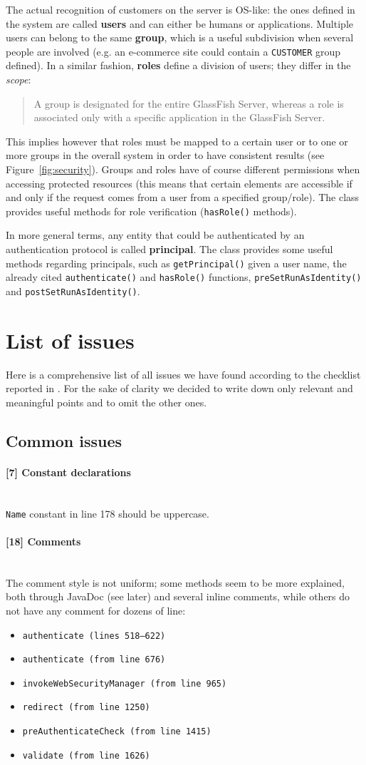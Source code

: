 \documentclass[a4paper, 11pt]{article}
\newcommand{\code}[1]{\texttt{#1}}
\newcommand{\issue}[3][?]{
    \paragraph{[#1] #2} \mbox{}\\ #3
}
\begin{document}
The actual recognition of customers on the server is OS-like: the ones defined in the system are called \textbf{users} and can either be humans or applications. Multiple users can belong to the same \textbf{group}, which is a useful subdivision when several people are involved (e.g. an e-commerce site could contain a \code{CUSTOMER} group defined). In a similar fashion, \textbf{roles} define a division of users; they differ in the \emph{scope}:
\begin{quote}
    A group is designated for the entire GlassFish Server, whereas a role is associated only with a specific application in the GlassFish Server.
\end{quote}
This implies however that roles must be mapped to a certain user or to one or more groups in the overall system in order to have consistent results (see Figure~\ref{fig:security}).
Groups and roles have of course different permissions when accessing protected resources (this means that certain elements are accessible if and only if the request comes from a user from a specified group/role). The class provides useful methods for role verification (\code{hasRole()} methods).

In more general terms, any entity that could be authenticated by an authentication protocol is called \textbf{principal}. The class provides some useful methods regarding principals, such as \code{getPrincipal()} given a user name, the already cited \code{authenticate()} and \code{hasRole()} functions, \code{preSetRunAsIdentity()} and \code{postSetRunAsIdentity()}.

\newpage
\section{List of issues}

Here is a comprehensive list of all issues we have found according to the
checklist reported in \cite{bib:assignment}.
For the sake of clarity we decided to write down only relevant and 
meaningful points and to omit the other ones.

\subsection{Common issues} %
\issue[7]{Constant declarations}{
    \code{Name} constant in line 178 should be uppercase.
}

\issue[18]{Comments} {
The comment style is not uniform; some methods seem to be more explained, 
both through JavaDoc (see later) and several inline comments, while others 
do not have any comment for dozens of line:
\begin{itemize}
\item \code{authenticate (lines 518--622)} 
\item \code{authenticate (from line 676)} 
\item \code{invokeWebSecurityManager (from line 965)} 
\item \code{redirect (from line 1250)} 
\item \code{preAuthenticateCheck (from line 1415)} 
\item \code{validate (from line 1626)} 
\end{itemize}
}
\end{document}
